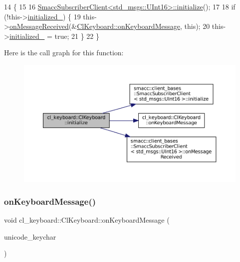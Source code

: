 \begin{DoxyCode}
14                             \{
15 
16   \hyperlink{classsmacc_1_1client__bases_1_1SmaccSubscriberClient_af188f0f5e89de26a07e1f964cdd23a70}{SmaccSubscriberClient<std\_msgs::UInt16>::initialize}();
17 
18   \textcolor{keywordflow}{if} (!this->\hyperlink{classcl__keyboard_1_1ClKeyboard_a96128ed5180e0dc5cfe76c90a9f8e8f7}{initialized\_}) \{
19     this->\hyperlink{classsmacc_1_1client__bases_1_1SmaccSubscriberClient_a4f02251e3a161fb6d802b154b1081f18}{onMessageReceived}(&\hyperlink{classcl__keyboard_1_1ClKeyboard_aff50ebe6b1b4aad0ea5b933ab0f00ef4}{ClKeyboard::onKeyboardMessage}, \textcolor{keyword}{
      this});
20     this->\hyperlink{classcl__keyboard_1_1ClKeyboard_a96128ed5180e0dc5cfe76c90a9f8e8f7}{initialized\_} = \textcolor{keyword}{true};
21   \}
22 \}
\end{DoxyCode}
Here is the call graph for this function\+:
\nopagebreak
\begin{figure}[H]
\begin{center}
\leavevmode
\includegraphics[width=350pt]{classcl__keyboard_1_1ClKeyboard_af7f7fd9871ef5fcca400cd59d7b60775_cgraph}
\end{center}
\end{figure}
\mbox{\label{classcl__keyboard_1_1ClKeyboard_aff50ebe6b1b4aad0ea5b933ab0f00ef4}} 
\subsubsection{\texorpdfstring{on\+Keyboard\+Message()}{onKeyboardMessage()}}
{\footnotesize\ttfamily void cl\+\_\+keyboard\+::\+Cl\+Keyboard\+::on\+Keyboard\+Message (\begin{DoxyParamCaption}\item[{const std\+\_\+msgs\+::\+U\+Int16 \&}]{unicode\+\_\+keychar }\end{DoxyParamCaption})}



